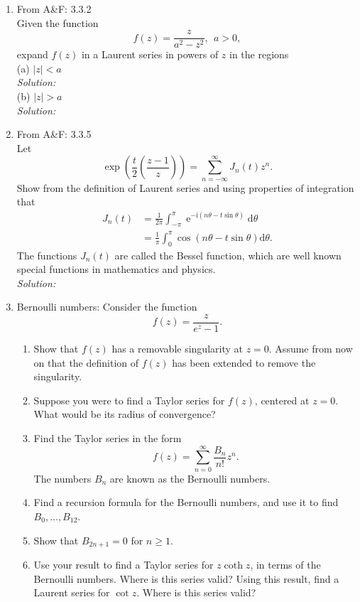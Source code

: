 \documentclass[10pt]{amsart}
\newcommand{\D}{\mathrm{d}}
\newcommand{\I}{\mathrm{i}}
\DeclareMathOperator{\E}{e}
\theoremstyle{nonumberplain}
\begin{document}
\mline
\begin{enumerate}[label={\bf {\arabic*}:}]
\item  From A\&F: 3.3.2\\
Given the function $$f(z) = \frac z {a^2 - z^2}, \: \: a > 0,$$
expand $f(z)$ in a Laurent series in powers of $z$ in the regions \\

\noindent
(a) $|z| < a$ \\
\textit{Solution:} \\

\noindent
(b) $|z| > a$ \\
\textit{Solution:} \\
\newpage

\item From A\&F: 3.3.5\\
Let
$$\exp\left(\frac t 2 \left(\frac {z - 1} {z}\right)\right) = \sum_{n = -\infty}^\infty J_n(t)z^n.$$
Show from the definition of Laurent series and using properties of integration that
\begin{align*}
J_n(t) &= \frac 1 {2 \pi} \int_{-\pi}^\pi \E^{-\I(n \theta - t \sin \theta)}\D \theta \\
	&= \frac 1 {\pi} \int_{0}^\pi \cos(n \theta - t \sin \theta)\D \theta.
\end{align*}
The functions $J_n(t)$ are called the Bessel function, which are well known special functions in mathematics and physics. \\
\textit{Solution:} \\
\newpage

\item Bernoulli numbers: Consider the function
$$
f(z)=\frac{z}{e^z-1} .
$$
\begin{enumerate}
\item Show that $f(z)$ has a removable singularity at $z=0$. Assume from now on that the definition of $f(z)$ has been extended to remove the singularity.
\item Suppose you were to find a Taylor series for $f(z)$, centered at $z=0$. What would be its radius of convergence?
\item Find the Taylor series in the form
$$
f(z)=\sum_{n=0}^{\infty} \frac{B_n}{n!} z^n .
$$
The numbers $B_n$ are known as the Bernoulli numbers.
\item Find a recursion formula for the Bernoulli numbers, and use it to find $B_0, \ldots, B_{12}$.
\item Show that $B_{2 n+1}=0$ for $n \geq 1$.
\item Use your result to find a Taylor series for $z \operatorname{coth} z$, in terms of the Bernoulli numbers. Where is this series valid? Using this result, find a Laurent series for $\cot z$. Where is this series valid?    \\
\end{enumerate}
\newpage


\end{enumerate}
\end{document}
